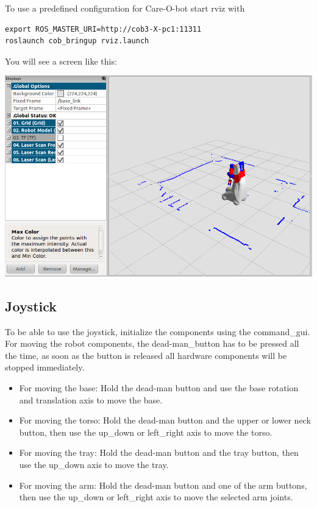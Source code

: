 To use a predefined configuration for Care-O-bot start rviz with
\begin{lstlisting}
export ROS_MASTER_URI=http://cob3-X-pc1:11311
roslaunch cob_bringup rviz.launch
\end{lstlisting}

You will see a screen like this:
\begin {center}
\includegraphics[width=1\textwidth]{images/rviz.png}
\end{center}

\subsection{Joystick}
To be able to use the joystick, initialize the components using the command\_gui. For moving the robot components, the dead-man\_button has to be pressed all the time, as soon as the button is released all hardware components will be stopped immediately. 

\begin{itemize}
\item For moving the base: Hold the dead-man button and use the base rotation and translation axis to move the base.
\item For moving the torso: Hold the dead-man button and the upper or lower neck button, then use the up\_down or left\_right axis to move the torso.
\item For moving the tray: Hold the dead-man button and the tray button, then use the up\_down axis to move the tray.
\item For moving the arm: Hold the dead-man button and one of the arm buttons, then use the up\_down or left\_right axis to move the selected arm joints.
\end{itemize}

